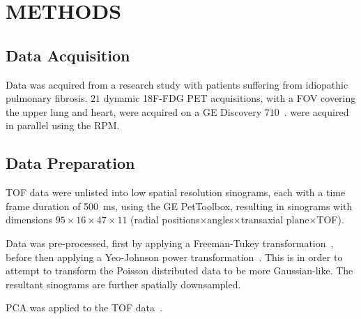 \section{METHODS} \label{sec:methods}
    \subsection{Data Acquisition} \label{sec:data_acquisition}
        Data was acquired from a research study with patients suffering from idiopathic pulmonary fibrosis. $21$ dynamic \acrshort{18F-FDG} \acrshort{PET} acquisitions, with a \acrlong{FOV} covering the upper lung and heart, were acquired on a \acrshort{GE} Discovery $710$~\cite{Oh2019OptimalTreatment, Emond2020EffectReconstruction}.  were acquired in parallel using the \gls{RPM}.
    
        
    \subsection{Data Preparation} \label{sec:data_preparation}
        \gls{TOF} data were unlisted into low spatial resolution sinograms, each with a time frame duration of \SI{500}{\milli\second}, using the \acrshort{GE} PetToolbox, resulting in sinograms with dimensions $95\times16\times47\times11$ (radial positions$\times$angles$\times$transaxial plane$\times$\gls{TOF}).
        
        Data was pre-processed, first by applying a Freeman-Tukey transformation~\cite{Freeman1950TransformationsRoot}, before then applying a Yeo-Johnson power transformation~\cite{Yeo2000ASymmetry}. This is in order to attempt to transform the Poisson distributed data to be more Gaussian-like. The resultant sinograms are further spatially downsampled.
        
        \acrshort{PCA} was applied to the \gls{TOF} data~\cite{Bertolli2017DataData}.
    
        
